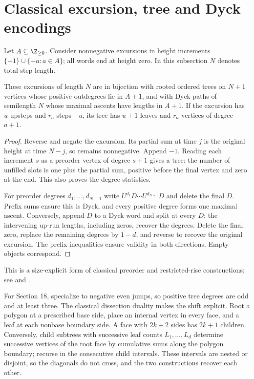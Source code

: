 \section{Classical excursion, tree and Dyck encodings}
Let $A\subseteq\Z_{\ge0}$. Consider nonnegative excursions in height increments $\{+1\}\cup\{-a:a\in A\}$; all words end at height zero. In this subsection $N$ denotes total step length.
\begin{theorem}\label{thm:trees}
These excursions of length $N$ are in bijection with rooted ordered trees on $N+1$ vertices whose positive outdegrees lie in $A+1$, and with Dyck paths of semilength $N$ whose maximal ascents have lengths in $A+1$. If the excursion has $u$ upsteps and $r_a$ steps $-a$, its tree has $u+1$ leaves and $r_a$ vertices of degree $a+1$.
\end{theorem}
\begin{proof}
Reverse and negate the excursion. Its partial sum at time $j$ is the original height at time $N-j$, so remains nonnegative. Append $-1$. Reading each increment $s$ as a preorder vertex of degree $s+1$ gives a tree: the number of unfilled slots is one plus the partial sum, positive before the final vertex and zero at the end. This also proves the degree statistics.

For preorder degrees $d_1,\ldots,d_{N+1}$ write $U^{d_1}D\cdots U^{d_{N+1}}D$ and delete the final $D$. Prefix sums ensure this is Dyck, and every positive degree forms one maximal ascent. Conversely, append $D$ to a Dyck word and split at every $D$; the intervening up-run lengths, including zeros, recover the degrees. Delete the final zero, replace the remaining degrees by $1-d$, and reverse to recover the original excursion. The prefix inequalities ensure validity in both directions. Empty objects correspond.
\end{proof}
This is a size-explicit form of classical preorder and restricted-rise constructions; see \cite[Proposition 2]{HacklEtAl} and \cite{BrakEtAl}.

For Section 18, specialize to negative even jumps, so positive tree degrees are odd and at least three. The classical dissection duality \cite[Proposition 2.2]{CurienKortchemski} makes the shift explicit. Root a polygon at a prescribed base side, place an internal vertex in every face, and a leaf at each nonbase boundary side. A face with $2k+2$ sides has $2k+1$ children. Conversely, child subtrees with successive leaf counts $L_1,\ldots,L_d$ determine successive vertices of the root face by cumulative sums along the polygon boundary; recurse in the consecutive child intervals. These intervals are nested or disjoint, so the diagonals do not cross, and the two constructions recover each other.

